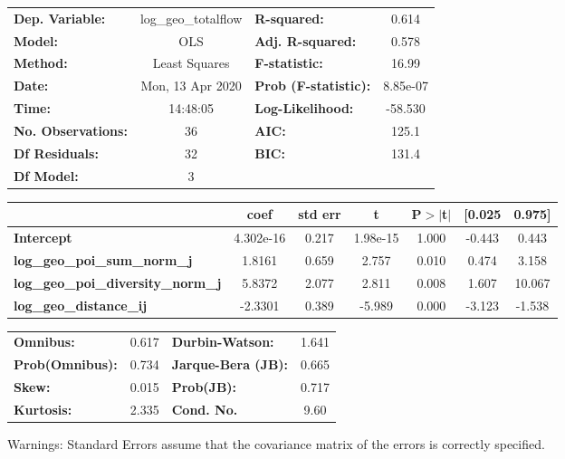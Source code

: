 \begin{center}
\begin{tabular}{lclc}
\toprule
\textbf{Dep. Variable:}                    & log\_geo\_totalflow & \textbf{  R-squared:         } &     0.614   \\
\textbf{Model:}                            &         OLS         & \textbf{  Adj. R-squared:    } &     0.578   \\
\textbf{Method:}                           &    Least Squares    & \textbf{  F-statistic:       } &     16.99   \\
\textbf{Date:}                             &   Mon, 13 Apr 2020  & \textbf{  Prob (F-statistic):} &  8.85e-07   \\
\textbf{Time:}                             &       14:48:05      & \textbf{  Log-Likelihood:    } &   -58.530   \\
\textbf{No. Observations:}                 &            36       & \textbf{  AIC:               } &     125.1   \\
\textbf{Df Residuals:}                     &            32       & \textbf{  BIC:               } &     131.4   \\
\textbf{Df Model:}                         &             3       & \textbf{                     } &             \\
\bottomrule
\end{tabular}
\begin{tabular}{lcccccc}
                                           & \textbf{coef} & \textbf{std err} & \textbf{t} & \textbf{P$> |$t$|$} & \textbf{[0.025} & \textbf{0.975]}  \\
\midrule
\textbf{Intercept}                         &    4.302e-16  &        0.217     &  1.98e-15  &         1.000        &       -0.443    &        0.443     \\
\textbf{log\_geo\_poi\_sum\_norm\_j}       &       1.8161  &        0.659     &     2.757  &         0.010        &        0.474    &        3.158     \\
\textbf{log\_geo\_poi\_diversity\_norm\_j} &       5.8372  &        2.077     &     2.811  &         0.008        &        1.607    &       10.067     \\
\textbf{log\_geo\_distance\_ij}            &      -2.3301  &        0.389     &    -5.989  &         0.000        &       -3.123    &       -1.538     \\
\bottomrule
\end{tabular}
\begin{tabular}{lclc}
\textbf{Omnibus:}       &  0.617 & \textbf{  Durbin-Watson:     } &    1.641  \\
\textbf{Prob(Omnibus):} &  0.734 & \textbf{  Jarque-Bera (JB):  } &    0.665  \\
\textbf{Skew:}          &  0.015 & \textbf{  Prob(JB):          } &    0.717  \\
\textbf{Kurtosis:}      &  2.335 & \textbf{  Cond. No.          } &     9.60  \\
\bottomrule
\end{tabular}
\end{center}

Warnings: \newline
 [1] Standard Errors assume that the covariance matrix of the errors is correctly specified.